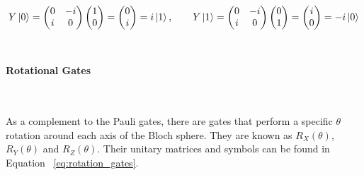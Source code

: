 \begin{equation}\label{eq:pauli_y_basis}
  Y\ket{0} = \begin{pmatrix}
               0 & -i \\
               i & 0
             \end{pmatrix}
             \begin{pmatrix} 1 \\ 0 \end{pmatrix} = 
             \begin{pmatrix} 0 \\ i \end{pmatrix} =
             i\ket{1}, \qquad
  Y\ket{1} = \begin{pmatrix}
               0 & -i \\
               i & 0
            \end{pmatrix}
            \begin{pmatrix} 0 \\ 1 \end{pmatrix} = 
            \begin{pmatrix} i \\ 0 \end{pmatrix} =
            -i\ket{0}
\end{equation} \

\pagebreak

\paragraph{Rotational Gates} \

As a complement to the Pauli gates, there are gates that
perform a specific \(\theta\) rotation around each axis of the
Bloch sphere. They are known as \(R_{X}\left(\theta\right)\),
\(R_{Y}\left(\theta\right)\) and \(R_{Z}\left(\theta\right)\).
Their unitary matrices and symbols can be found in Equation
~\ref{eq:rotation_gates}. \

